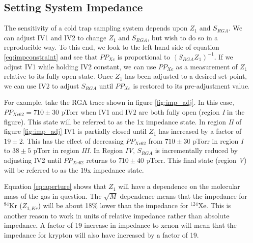 \subsection{Setting System Impedance}
\label{sec:imp_set}
The sensitivity of a cold trap sampling system depends upon $Z_1$ and $S_{RGA}$. We can adjust IV1 and IV2 to change $Z_1$ and $S_{RGA}$, but wish to do so in a reproducible way. To this end, we look to the left hand side of equation \ref{eq:impconstraint} and see that $PP_{Xe}$ is proportional to $(S_{RGA}Z_1)^{-1}$. If we adjust IV1 while holding IV2 constant, we can use $PP_{Xe}$ as a measurement of $Z_1$ relative to its fully open state. Once $Z_1$ has been adjusted to a desired set-point, we can use IV2 to adjust $S_{RGA}$ until $PP_{Xe}$ is restored to its pre-adjustment value.

For example, take the RGA trace shown in figure \ref{fig:imp_adj}. In this case, $PP_{Xe62}= 710 \pm30$ pTorr when IV1 and IV2 are both fully open (region \emph{I} in the figure). This state will be referred to as the 1x impedance state. In region \emph{II} of figure \ref{fig:imp_adj} IV1 is partially closed until $Z_1$ has increased by a factor of $19\pm2$. This has the effect of decreasing $PP_{Xe62}$ from $710\pm30$ pTorr in region \emph{I} to $38\pm5$ pTorr in region \emph{III}. In Region \emph{IV}, $S_{RGA}$ is incrementally reduced by adjusting IV2 until $PP_{Xe62}$ returns to $710\pm40$ pTorr. This final state (region \emph{V}) will be referred to as the 19x impedance state. 

Equation \ref{eq:aperture} shows that $Z_1$ will have a dependence on the molecular mass of the gas in question. The $\sqrt{M}$ dependence means that the impedance for $^{84}$Kr ($Z_{1,Kr}$) will be about 18\% lower than the impedance for $^{124}$Xe. This is another reason to work in units of relative impedance rather than absolute impedance. A factor of 19 increase in impedance to xenon will mean that the impedance for krypton will also have increased by a factor of 19.

